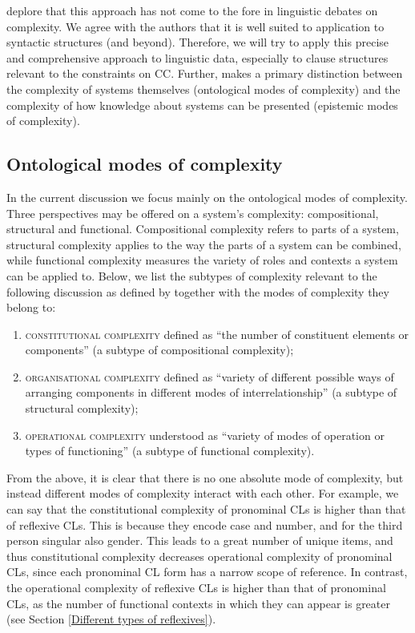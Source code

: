 \citet[][vii]{KMS08} deplore that this approach has not come to the fore in linguistic debates on complexity. We agree with the authors that it is well suited to application to syntactic structures (and beyond). Therefore, we will try to apply this precise and comprehensive approach to linguistic data, especially to clause structures relevant to the constraints on CC. Further, \citet[][]{Rescher98} makes a primary distinction between the complexity of systems themselves (ontological modes of complexity) and the complexity of how knowledge about systems can be presented (epistemic modes of complexity).

\subsection{Ontological modes of complexity}
\label{Ontological modes of complexity}
In the current discussion we focus mainly on the ontological modes of complexity. Three perspectives may be offered on a system’s complexity: compositional, structural and functional. Compositional complexity refers to parts of a system, structural complexity applies to the way the parts of a system can be combined, while functional complexity measures the variety of roles and contexts a system can be applied to. Below, we list the subtypes of complexity relevant to the following discussion as defined by \citet[][9]{Rescher98} together with the modes of complexity they belong to:

\begin{enumerate}\sloppy
\item \textsc{constitutional} \textsc{complexity} defined as “the number of constituent elements or components” (a subtype of compositional complexity);
\item \textsc{organisational} \textsc{complexity} defined as “variety of different possible ways of arranging components in different modes of interrelationship” (a subtype of structural complexity);
\item \textsc{operational} \textsc{complexity} understood as “variety of modes of operation or types of functioning” (a subtype of functional complexity). 
\end{enumerate}

From the above, it is clear that there is no one absolute mode of complexity, but instead different modes of complexity interact with each other. For example, we can say that the constitutional complexity of pronominal CLs is higher than that of reflexive CLs. This is because they encode case and number, and for the third person singular also gender. This leads to a great number of unique items, and thus constitutional complexity decreases operational complexity of pronominal CLs, since each pronominal CL form has a narrow scope of reference. In contrast, the operational complexity of reflexive CLs is higher than that of pronominal CLs, as the number of functional contexts in which they can appear is greater (see Section \ref{Different types of reflexives}).

